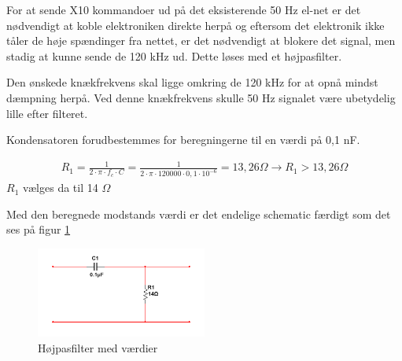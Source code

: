 For at sende X10 kommandoer ud på det eksisterende 50 Hz el-net er det nødvendigt at koble elektroniken direkte herpå og eftersom det elektronik ikke tåler de høje spændinger fra nettet, er det nødvendigt at blokere det signal, men stadig at kunne sende de 120 kHz ud. Dette løses med et højpasfilter.

Den ønskede knækfrekvens skal ligge omkring de 120 kHz for at opnå mindst dæmpning herpå. Ved denne knækfrekvens skulle 50 Hz signalet være ubetydelig lille efter filteret. 

Kondensatoren forudbestemmes for beregningerne til en værdi på 0,1 nF.

\begin{align}
R_1 = \frac{1}{2 \cdot \pi \cdot f_c \cdot C } = \frac{1}{2 \cdot \pi \cdot 120000 \cdot 0,1 \cdot 10^{-6}} = 13,26 \Omega
\rightarrow R_1 > 13,26 \Omega
\end{align}
$R_1$ vælges da til 14 $\Omega$

Med den beregnede modstands værdi er det endelige schematic færdigt som det ses på figur \ref{fig:HP_MV}

\begin{figure}[htbp]
	\centering
	\includegraphics[width=0.50\textwidth]{billeder/HWdesign/HP_MV.png}
	\caption{Højpasfilter med værdier}
	\label{fig:HP_MV}
\end{figure}

\newpage
  
